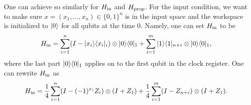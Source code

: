 One can achieve so similarly for $H_{\mathrm{in}}$ and $H_{\mathrm{prop}}$. For the input condition, we want to make sure $x=(x_1, \ldots, x_n) \in \{0,1\}^n$ is in the input space and the workspace is initialized to $\ket{0}$ for all qubits at the time $0$. Namely, one can set $H_{\mathrm{in}}$ to be
\begin{equation}
    H_{\mathrm{in}} = \sum_{i=1}^n(I- |x_i\rangle\langle x_i|_i)\otimes |0\rangle\langle 0|_1 + \sum_{i=1}^m |1\rangle\langle 1|_{n+i} \otimes |0\rangle\langle 0|_1,
\end{equation}
where the last part $|0\rangle\langle 0|_1$ applies on to the first qubit in the clock register. One can rewrite $H_{\mathrm{in}}$ as
\begin{equation}\label{eqn:Hin}
 H_{\mathrm{in}}=\frac{1}{4}\sum_{i=1}^n(I-(-1)^{x_i}Z_i)\otimes(I+Z_1) + \frac{1}{4} \sum_{i=1}^m (I - Z_{n+i}) \otimes (I + Z_1).
\end{equation}

